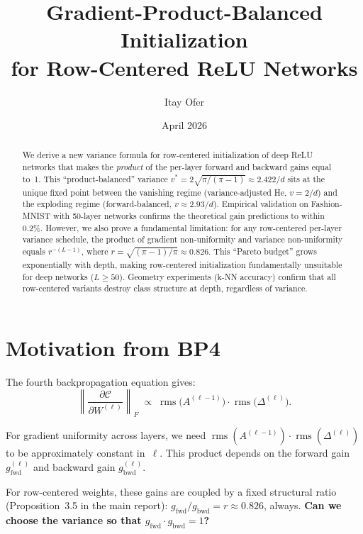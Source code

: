 \documentclass[11pt,a4paper]{article}
\title{%
  Gradient-Product-Balanced Initialization\\
  for Row-Centered ReLU Networks
}
\author{Itay Ofer}
\date{April 2026}
\theoremstyle{definition}
\newcommand{\rms}{\operatorname{rms}}
\begin{document}
\maketitle

\begin{abstract}
We derive a new variance formula for row-centered initialization of deep ReLU
networks that makes the \emph{product} of the per-layer forward and backward
gains equal to~1.  This ``product-balanced'' variance
$v^{\ast} = 2\sqrt{\pi/(\pi-1)} \approx 2.422/d$ sits at the unique fixed point
between the vanishing regime (variance-adjusted He, $v=2/d$) and the exploding
regime (forward-balanced, $v \approx 2.93/d$).  Empirical validation on
Fashion-MNIST with 50-layer networks confirms the theoretical gain predictions
to within 0.2\%.  However, we also prove a fundamental limitation: for any
row-centered per-layer variance schedule, the product of gradient non-uniformity
and variance non-uniformity equals $r^{-(L-1)}$, where
$r = \sqrt{(\pi-1)/\pi} \approx 0.826$.  This ``Pareto budget'' grows
exponentially with depth, making row-centered initialization fundamentally
unsuitable for deep networks ($L \geq 50$).  Geometry experiments (k-NN
accuracy) confirm that all row-centered variants destroy class structure
at depth, regardless of variance.
\end{abstract}

\tableofcontents
\newpage

\section{Motivation from BP4}
\label{sec:motivation}

The fourth backpropagation equation gives:
\begin{equation}\label{eq:bp4}
  \left\|\frac{\partial \mathcal{C}}{\partial W^{(\ell)}}\right\|_F
  \;\propto\; \rms\!\bigl(A^{(\ell-1)}\bigr) \cdot \rms\!\bigl(\Delta^{(\ell)}\bigr).
\end{equation}

For gradient uniformity across layers, we need
$\rms(A^{(\ell-1)}) \cdot \rms(\Delta^{(\ell)})$ to be approximately constant
in~$\ell$.  This product depends on the forward gain
$g_{\mathrm{fwd}}^{(\ell)}$ and backward gain $g_{\mathrm{bwd}}^{(\ell)}$.

For row-centered weights, these gains are coupled by a fixed structural ratio
(Proposition~3.5 in the main report): $g_{\mathrm{fwd}}/g_{\mathrm{bwd}} = r
\approx 0.826$, always.  \textbf{Can we choose the variance so that
$g_{\mathrm{fwd}} \cdot g_{\mathrm{bwd}} = 1$?}
\end{document}
